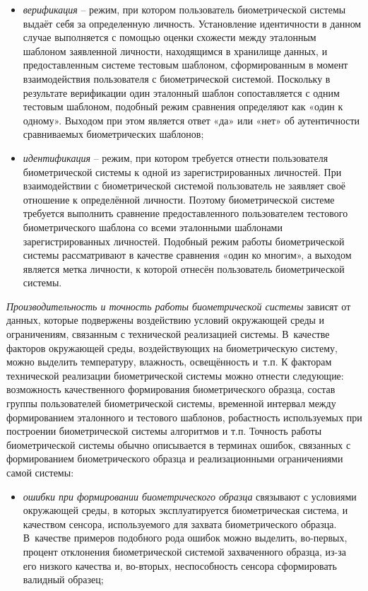 \documentclass[12pt]{book}
\begin{document}
{\begin{itemize}[topsep=1pt] \itemsep0.1em
\item \textit{верификация} -- режим, при котором пользователь биометрической системы выдаёт себя за определенную личность. Установление идентичности в данном случае выполняется с помощью оценки схожести между эталонным шаблоном заявленной личности, находящимся в хранилище данных, и предоставленным системе тестовым шаблоном, сформированным в момент взаимодействия пользователя с биометрической системой. Поскольку в результате верификации один эталонный шаблон сопоставляется с одним тестовым шаблоном, подобный режим сравнения определяют как «один к одному». Выходом при этом является ответ «да» или «нет» об аутентичности сравниваемых биометрических шаблонов;

\item \textit{идентификация} -- режим, при котором требуется отнести пользователя биометрической системы к одной из зарегистрированных личностей. При взаимодействии с биометрической системой пользователь не заявляет своё отношение к определённой личности. Поэтому биометрической системе требуется выполнить сравнение предоставленного пользователем тестового биометрического шаблона со всеми эталонными шаблонами зарегистрированных личностей. Подобный режим работы биометрической системы рассматривают в качестве сравнения «один ко многим», а выходом является метка личности, к которой отнесён пользователь биометрической системы.
\end{itemize}

\textit{Производительность и точность работы биометрической системы} зависят от данных, которые подвержены воздействию условий окружающей среды и ограничениям, связанным с технической реализацией системы. В~качестве факторов окружающей среды, воздействующих на биометрическую систему, можно выделить температуру, влажность, освещённость и~т.п. К факторам технической реализации биометрической системы можно отнести следующие: возможность качественного формирования биометрического образца, состав группы пользователей биометрической системы, временной интервал между формированием эталонного и тестового шаблонов, робастность используемых при построении биометрической системы алгоритмов и т.п. Точность работы биометрической системы обычно описывается в терминах ошибок, связанных с формированием биометрического образца и реализационными ограничениями самой системы:

\begin{itemize}[topsep=1pt] \itemsep0.1em
\item \textit{ошибки при формировании биометрического образца} связывают с условиями окружающей среды, в которых эксплуатируется биометрическая система, и качеством сенсора, используемого для захвата биометрического образца. В~качестве примеров подобного рода ошибок можно выделить, во-первых, процент отклонения биометрической системой захваченного образца, из-за его низкого качества и, во-вторых, неспособность сенсора сформировать валидный образец;


\end{itemize}}
\end{document}
